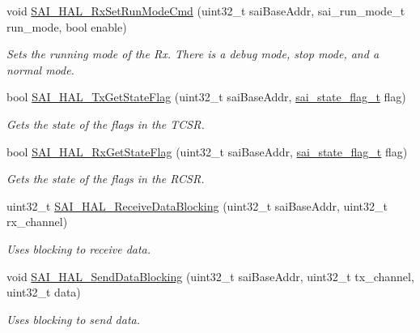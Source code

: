 \begin{DoxyCompactItemize}
void \hyperlink{group__sai__hal_ga8b89e95d9024689db103e42236b4bc53}{S\+A\+I\+\_\+\+H\+A\+L\+\_\+\+Rx\+Set\+Run\+Mode\+Cmd} (uint32\+\_\+t sai\+Base\+Addr, sai\+\_\+run\+\_\+mode\+\_\+t run\+\_\+mode, bool enable)
\begin{DoxyCompactList}\small\item\em Sets the running mode of the Rx. There is a debug mode, stop mode, and a normal mode. \end{DoxyCompactList}\item 
bool \hyperlink{group__sai__hal_ga03a9643f79b1d53477258083c1c0c68a}{S\+A\+I\+\_\+\+H\+A\+L\+\_\+\+Tx\+Get\+State\+Flag} (uint32\+\_\+t sai\+Base\+Addr, \hyperlink{group__sai__hal_gafe5a7889b1a42b3e54be7cad3091a5ee}{sai\+\_\+state\+\_\+flag\+\_\+t} flag)
\begin{DoxyCompactList}\small\item\em Gets the state of the flags in the T\+C\+SR. \end{DoxyCompactList}\item 
bool \hyperlink{group__sai__hal_ga4d51d543344c9efc774357c2bd396a7e}{S\+A\+I\+\_\+\+H\+A\+L\+\_\+\+Rx\+Get\+State\+Flag} (uint32\+\_\+t sai\+Base\+Addr, \hyperlink{group__sai__hal_gafe5a7889b1a42b3e54be7cad3091a5ee}{sai\+\_\+state\+\_\+flag\+\_\+t} flag)
\begin{DoxyCompactList}\small\item\em Gets the state of the flags in the R\+C\+SR. \end{DoxyCompactList}\item 
uint32\+\_\+t \hyperlink{group__sai__hal_gab7403e1aa123e602db47542a2b946eac}{S\+A\+I\+\_\+\+H\+A\+L\+\_\+\+Receive\+Data\+Blocking} (uint32\+\_\+t sai\+Base\+Addr, uint32\+\_\+t rx\+\_\+channel)
\begin{DoxyCompactList}\small\item\em Uses blocking to receive data. \end{DoxyCompactList}\item 
void \hyperlink{group__sai__hal_gad0a9d3631dc731cf8edc04d2e0183f1f}{S\+A\+I\+\_\+\+H\+A\+L\+\_\+\+Send\+Data\+Blocking} (uint32\+\_\+t sai\+Base\+Addr, uint32\+\_\+t tx\+\_\+channel, uint32\+\_\+t data)
\begin{DoxyCompactList}\small\item\em Uses blocking to send data. \end{DoxyCompactList}\end{DoxyCompactItemize}
